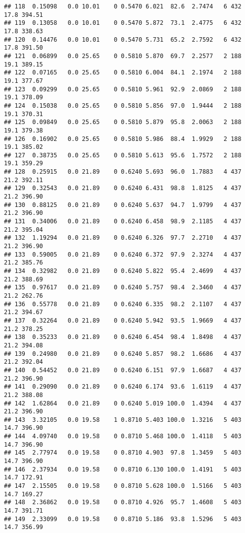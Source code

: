 \documentclass[
]{article}
\begin{document}
\begin{verbatim}
## 118  0.15098   0.0 10.01    0 0.5470 6.021  82.6  2.7474   6 432    17.8 394.51
## 119  0.13058   0.0 10.01    0 0.5470 5.872  73.1  2.4775   6 432    17.8 338.63
## 120  0.14476   0.0 10.01    0 0.5470 5.731  65.2  2.7592   6 432    17.8 391.50
## 121  0.06899   0.0 25.65    0 0.5810 5.870  69.7  2.2577   2 188    19.1 389.15
## 122  0.07165   0.0 25.65    0 0.5810 6.004  84.1  2.1974   2 188    19.1 377.67
## 123  0.09299   0.0 25.65    0 0.5810 5.961  92.9  2.0869   2 188    19.1 378.09
## 124  0.15038   0.0 25.65    0 0.5810 5.856  97.0  1.9444   2 188    19.1 370.31
## 125  0.09849   0.0 25.65    0 0.5810 5.879  95.8  2.0063   2 188    19.1 379.38
## 126  0.16902   0.0 25.65    0 0.5810 5.986  88.4  1.9929   2 188    19.1 385.02
## 127  0.38735   0.0 25.65    0 0.5810 5.613  95.6  1.7572   2 188    19.1 359.29
## 128  0.25915   0.0 21.89    0 0.6240 5.693  96.0  1.7883   4 437    21.2 392.11
## 129  0.32543   0.0 21.89    0 0.6240 6.431  98.8  1.8125   4 437    21.2 396.90
## 130  0.88125   0.0 21.89    0 0.6240 5.637  94.7  1.9799   4 437    21.2 396.90
## 131  0.34006   0.0 21.89    0 0.6240 6.458  98.9  2.1185   4 437    21.2 395.04
## 132  1.19294   0.0 21.89    0 0.6240 6.326  97.7  2.2710   4 437    21.2 396.90
## 133  0.59005   0.0 21.89    0 0.6240 6.372  97.9  2.3274   4 437    21.2 385.76
## 134  0.32982   0.0 21.89    0 0.6240 5.822  95.4  2.4699   4 437    21.2 388.69
## 135  0.97617   0.0 21.89    0 0.6240 5.757  98.4  2.3460   4 437    21.2 262.76
## 136  0.55778   0.0 21.89    0 0.6240 6.335  98.2  2.1107   4 437    21.2 394.67
## 137  0.32264   0.0 21.89    0 0.6240 5.942  93.5  1.9669   4 437    21.2 378.25
## 138  0.35233   0.0 21.89    0 0.6240 6.454  98.4  1.8498   4 437    21.2 394.08
## 139  0.24980   0.0 21.89    0 0.6240 5.857  98.2  1.6686   4 437    21.2 392.04
## 140  0.54452   0.0 21.89    0 0.6240 6.151  97.9  1.6687   4 437    21.2 396.90
## 141  0.29090   0.0 21.89    0 0.6240 6.174  93.6  1.6119   4 437    21.2 388.08
## 142  1.62864   0.0 21.89    0 0.6240 5.019 100.0  1.4394   4 437    21.2 396.90
## 143  3.32105   0.0 19.58    1 0.8710 5.403 100.0  1.3216   5 403    14.7 396.90
## 144  4.09740   0.0 19.58    0 0.8710 5.468 100.0  1.4118   5 403    14.7 396.90
## 145  2.77974   0.0 19.58    0 0.8710 4.903  97.8  1.3459   5 403    14.7 396.90
## 146  2.37934   0.0 19.58    0 0.8710 6.130 100.0  1.4191   5 403    14.7 172.91
## 147  2.15505   0.0 19.58    0 0.8710 5.628 100.0  1.5166   5 403    14.7 169.27
## 148  2.36862   0.0 19.58    0 0.8710 4.926  95.7  1.4608   5 403    14.7 391.71
## 149  2.33099   0.0 19.58    0 0.8710 5.186  93.8  1.5296   5 403    14.7 356.99

\end{verbatim}
\end{document}
